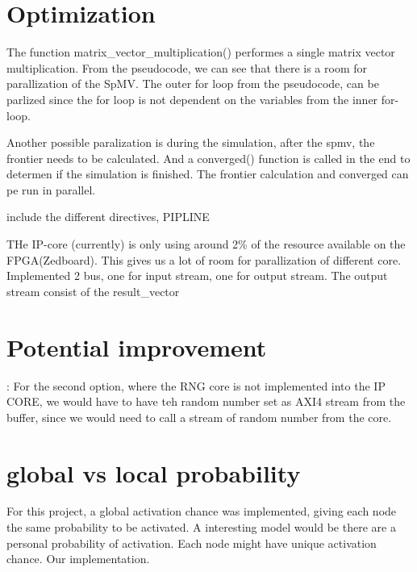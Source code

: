 \section{Optimization}
The function matrix\_vector\_multiplication() performes a single matrix vector multiplication. From the pseudocode, we can see that there is a room for parallization of the SpMV. The outer for loop from the pseudocode, can be parlized since the for loop is not dependent on the variables from the inner for-loop. 

Another possible paralization is during the simulation, after the spmv, the frontier needs to be calculated. And a converged() function is called in the end to determen if the simulation is finished. The frontier calculation and converged can pe run in parallel. 

include the different directives, PIPLINE

THe IP-core (currently) is only using around 2\% of the resource available on the FPGA(Zedboard). This gives us a lot of room for parallization of different core. Implemented 2 bus, one for input stream, one for output stream. The output stream consist of the result\_vector




\section{Potential improvement}:
For the second option, where the RNG core is not implemented into the IP CORE, we would have to have teh random number set as AXI4 stream from the buffer, since we would need to call a stream of random number from the core.


\section{global vs local probability}
For this project, a global activation chance was implemented, giving each node the same probability to be activated. A interesting model would be there are a personal probability of activation. Each node might have unique activation chance. Our implementation. 
